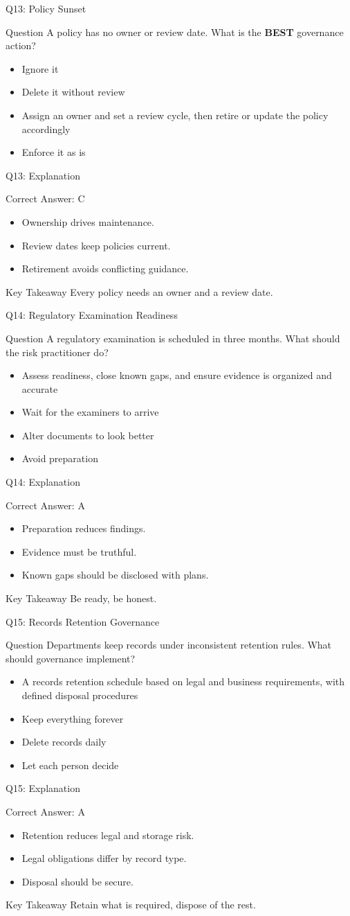 \documentclass[aspectratio=169]{beamer}
\newcommand{\hq}[7]{%
	\begin{frame}{Q#1: #2}
		\begin{block}{Question}
			#3
		\end{block}
		\begin{itemize}
			#4
		\end{itemize}
	\end{frame}
	\begin{frame}{Q#1: Explanation}
		\begin{block}{Correct Answer: #5}
			\begin{itemize}
				#6
			\end{itemize}
		\end{block}
		\begin{alertblock}{Key Takeaway}
			#7
		\end{alertblock}
	\end{frame}
}
\begin{document}
	\hq{13}{Policy Sunset}
	{A policy has no owner or review date. What is the \textbf{BEST} governance action?}
	{\item[\textbf{(A)}] Ignore it
		\item[\textbf{(B)}] Delete it without review
		\item[\textbf{(C)}] Assign an owner and set a review cycle, then retire or update the policy accordingly
		\item[\textbf{(D)}] Enforce it as is}
	{C}
	{\item Ownership drives maintenance.
		\item Review dates keep policies current.
		\item Retirement avoids conflicting guidance.}
	{Every policy needs an owner and a review date.}

	\hq{14}{Regulatory Examination Readiness}
	{A regulatory examination is scheduled in three months. What should the risk practitioner do?}
	{\item[\textbf{(A)}] Assess readiness, close known gaps, and ensure evidence is organized and accurate
		\item[\textbf{(B)}] Wait for the examiners to arrive
		\item[\textbf{(C)}] Alter documents to look better
		\item[\textbf{(D)}] Avoid preparation}
	{A}
	{\item Preparation reduces findings.
		\item Evidence must be truthful.
		\item Known gaps should be disclosed with plans.}
	{Be ready, be honest.}

	\hq{15}{Records Retention Governance}
	{Departments keep records under inconsistent retention rules. What should governance implement?}
	{\item[\textbf{(A)}] A records retention schedule based on legal and business requirements, with defined disposal procedures
		\item[\textbf{(B)}] Keep everything forever
		\item[\textbf{(C)}] Delete records daily
		\item[\textbf{(D)}] Let each person decide}
	{A}
	{\item Retention reduces legal and storage risk.
		\item Legal obligations differ by record type.
		\item Disposal should be secure.}
	{Retain what is required, dispose of the rest.}
\end{document}
